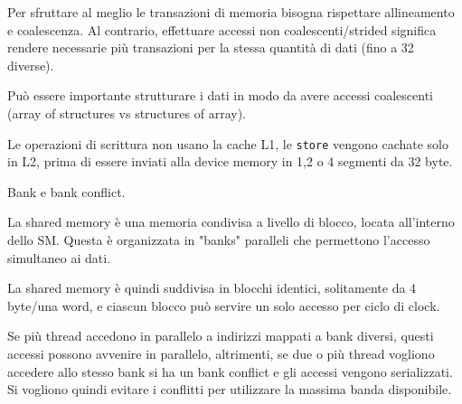 \begin{questions}
\begin{solution}
        Per sfruttare al meglio le transazioni di memoria bisogna rispettare allineamento e coalescenza. Al contrario, effettuare accessi non coalescenti/strided significa rendere necessarie più transazioni per la stessa quantità di dati (fino a 32 diverse).
        
        Può essere importante strutturare i dati in modo da avere accessi coalescenti (array of structures vs structures of array).
        
        Le operazioni di scrittura non usano la cache L1, le \texttt{store} vengono cachate solo in L2, prima di essere inviati alla device memory in 1,2 o 4 segmenti da 32 byte.
    \end{solution}
    
    \question Bank e bank conflict.
    
    \begin{solution}
        La shared memory è una memoria condivisa a livello di blocco, locata all'interno dello SM. Questa è organizzata in "banks" paralleli che permettono l'accesso simultaneo ai dati.
        
        La shared memory è quindi suddivisa in blocchi identici, solitamente da 4 byte/una word, e ciascun blocco può servire un solo accesso per ciclo di clock. 
        
        Se più thread accedono in parallelo a indirizzi mappati a bank diversi, questi accessi possono avvenire in parallelo, altrimenti, se due o più thread vogliono accedere allo stesso bank si ha un bank conflict e gli accessi vengono serializzati. Si vogliono quindi evitare i conflitti per utilizzare la massima banda disponibile.
    \end{solution}
\end{questions}